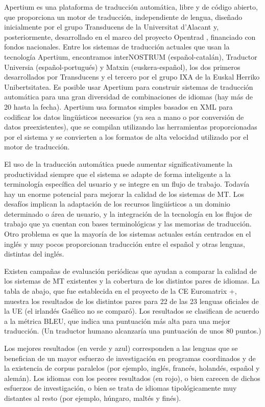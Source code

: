 \begin{multicols}{2}
Apertium es una plataforma de traducción automática, libre y de código abierto, que proporciona un motor de traducción, independiente de lengua, diseñado inicialmente por el grupo Transducens de la Universitat d'Alacant y, posteriormente, desarrollado en el marco del proyecto Opentrad , financiado con fondos nacionales. Entre los sistemas de traducción actuales que usan la tecnología Apertium, encontramos interNOSTRUM (español-catalán), Traductor Universia (español-portugués) y Matxin (euskera-español), los dos primeros desarrollados por Transducens y el tercero por el grupo IXA de la Euskal Herriko Unibertsitatea. Es posible usar Apertium para construir sistemas de traducción automática para una gran diversidad de combinaciones de idiomas (hay más de 20 hasta la fecha). Apertium usa formatos simples basados en XML para codificar los datos lingüísticos necesarios (ya sea a mano o por conversión de datos preexistentes), que se compilan utilizando las herramientas proporcionadas por el sistema y se convierten a los formatos de alta velocidad utilizado por el motor de traducción.

El uso de la traducción automática puede aumentar significativamente la productividad siempre que el sistema se adapte de forma inteligente a la terminología específica del usuario y se integre en un flujo de trabajo.
Todavía hay un enorme potencial para mejorar la calidad de los sistemas de MT. Los desafíos implican la adaptación de los recursos lingüísticos a un dominio determinado o área de usuario, y la integración de la tecnología en los flujos de trabajo que ya cuentan con bases terminológicas y las memorias de traducción. Otro problema es que la mayoría de los sistemas actuales están centrados en el inglés y  muy pocos proporcionan traducción entre el español y otras lenguas, distintas del inglés. 

Existen campañas de evaluación periódicas que ayudan a comparar la calidad de los sistemas de MT existentes y la cobertura de los distintos pares de idiomas. La tabla de abajo, que fue establecida en el proyecto de la CE Euromatrix +, muestra los resultados de los distintos pares para 22 de las 23 lenguas oficiales de la UE (el irlandés Gaélico no se comparó). Los resultados se clasifican de acuerdo a la métrica BLEU, que indica una puntuación más alta para una mejor traducción. (Un traductor humano alcanzaría una puntuación de unos 80 puntos.)

Los mejores resultados (en verde y azul) corresponden a las lenguas que se benefician de un mayor esfuerzo de investigación en programas coordinados y de la existencia de corpus paralelos (por ejemplo, inglés, francés, holandés, español y alemán). Los idiomas con los peores resultados (en rojo), o bien carecen de dichos esfuerzos de investigación, o bien se trata de idiomas tipológicamente muy distantes al resto (por ejemplo, húngaro, maltés y finés).


\end{multicols}
